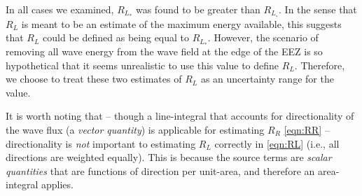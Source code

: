 In all cases we examined, $R_{L_*}$ was found to be greater than $R_{L_\circ}$.
In the sense that $R_L$ is meant to be an estimate of the maximum energy available, this suggests that $R_L$ could be defined as being equal to $R_{L_*}$. However, the scenario of removing all wave energy from the wave field at the edge of the EEZ is so hypothetical that it seems unrealistic to use this value to define $R_L$. Therefore, we choose to treat these two estimates of $R_L$ as an uncertainty range for the value.

It is worth noting that -- though a line-integral that accounts for directionality of the wave flux (a {\em vector quantity}) is applicable for estimating $R_R$ \eqref{eqn:RR} -- directionality is {\em not } important to estimating $R_L$ correctly in \eqref{eqn:RL} (i.e., all directions are weighted equally). This is because the source terms are {\em scalar quantities} that are functions of direction per unit-area, and therefore an area-integral applies.


